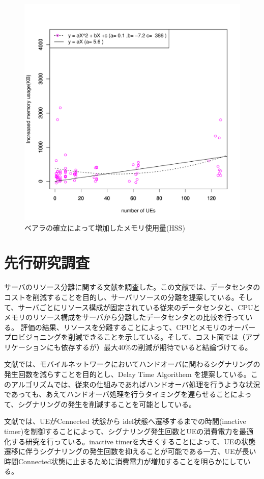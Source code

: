 \documentclass[a4j]{ujarticle}
\begin{document}
\begin{figure}[htbp]
	\centering
	\includegraphics[width=0.7\hsize]{hss_memory.pdf}
  \caption{ベアラの確立によって増加したメモリ使用量(HSS)}
	\label{hss_memory}
\end{figure}
\clearpage



\section{先行研究調査}
サーバのリソース分離に関する文献\cite{TechnoEconomicFrameworkforCloudInfrastructureACostStudyofResourceDisaggregation}を調査した。この文献では、データセンタのコストを削減することを目的し、サーバリソースの分離を提案している。そして、サーバごとにリソース構成が固定されている従来のデータセンタと、CPUとメモリのリソース構成をサーバから分離したデータセンタとの比較を行っている。
評価の結果、リソースを分離することによって、CPUとメモリのオーバープロビジョニングを削減できることを示している。そして、コスト面では（アプリケーションにも依存するが）最大40\%の削減が期待でいると結論づけてる。

文献\cite{ModelingDelayTimerAlgorithmforHandoverReductioninHeterogeneousRadioAccessNetworks}では、モバイルネットワークにおいてハンドオーバに関わるシグナリングの発生回数を減らすことを目的とし、Delay Time Algorithem を提案している。このアルゴリズムでは、従来の仕組みであればハンドオーバ処理を行うような状況であっても、あえてハンドオーバ処理を行うタイミングを遅らせることによって、シグナリングの発生を削減することを可能としている。

文献\cite{ModelingofMobilityAwareRRCStateTransitionforEnergyConstrainedSignalingReduction}では、UEがCennected 状態から idel状態へ遷移するまでの時間(inactive timer)を制御することによって、シグナリング発生回数とUEの消費電力を最適化する研究を行っている。inactive timerを大きくすることによって、UEの状態遷移に伴うシグナリングの発生回数を抑えることが可能である一方、UEが長い時間Connected状態に止まるために消費電力が増加することを明らかにしている。
\end{document}
